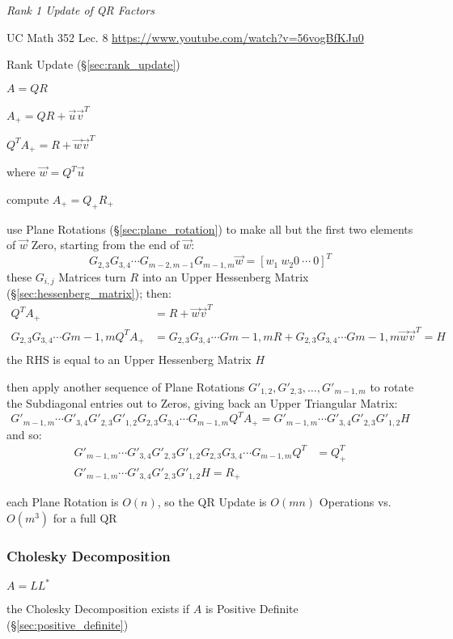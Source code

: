 \emph{Rank 1 Update of QR Factors}

UC Math 352 Lec. 8 \url{https://www.youtube.com/watch?v=56vogBfKJu0}

Rank Update (\S\ref{sec:rank_update})

$A = QR$

$A_+ = QR + \vec{u}\vec{v}^T$

$Q^T A_+ = R + \vec{w}\vec{v}^T$

where $\vec{w} = Q^T\vec{u}$

compute $A_+ = Q_+ R_+$

use Plane Rotations (\S\ref{sec:plane_rotation}) to make all but the first two
elements of $\vec{w}$ Zero, starting from the end of $\vec{w}$:
\[
  G_{2,3}G_{3,4}\cdots G_{m-2,m-1}G_{m-1,m} \vec{w} = [w_1 \ w_2 0 \ \cdots \ 0]^T
\]
these $G_{i,j}$ Matrices turn $R$ into an Upper Hessenberg Matrix
(\S\ref{sec:hessenberg_matrix}); then:
\begin{align*}
  Q^T A_+ & = R + \vec{w}\vec{v}^T \\
  G_{2,3}G_{3,4}\cdots G{m-1,m} Q^T A_+ & =
    G_{2,3}G_{3,4}\cdots G{m-1,m} R +
    G_{2,3}G_{3,4}\cdots G{m-1,m} \vec{w}\vec{v}^T  = H\\
\end{align*}
the RHS is equal to an Upper Hessenberg Matrix $H$

then apply another sequence of Plane Rotations $G'_{1,2}, G'_{2,3}, \ldots,
G'_{m-1,m}$ to rotate the Subdiagonal entries out to Zeros, giving back an
Upper Triangular Matrix:
\[
  G'_{m-1,m}\cdots G'_{3,4}G'_{2,3}G'_{1,2}G_{2,3}G_{3,4}\cdots G_{m-1,m}
    Q^T A_+ =
  G'_{m-1,m}\cdots G'_{3,4}G'_{2,3}G'_{1,2}H
\]
and so:
\begin{align*}
  G'_{m-1,m}\cdots G'_{3,4}G'_{2,3}G'_{1,2}G_{2,3}G_{3,4}\cdots G_{m-1,m} Q^T
    & = Q_+^T \\
  G'_{m-1,m}\cdots G'_{3,4}G'_{2,3}G'_{1,2}H = R_+
\end{align*}

each Plane Rotation is $O(n)$, so the QR Update is $O(mn)$ Operations vs.
$O(m^3)$ for a full QR



\subsubsection{Cholesky Decomposition}\label{sec:cholesky_decomposition}

$A = LL^*$

the Cholesky Decomposition exists if $A$ is Positive Definite
(\S\ref{sec:positive_definite})

